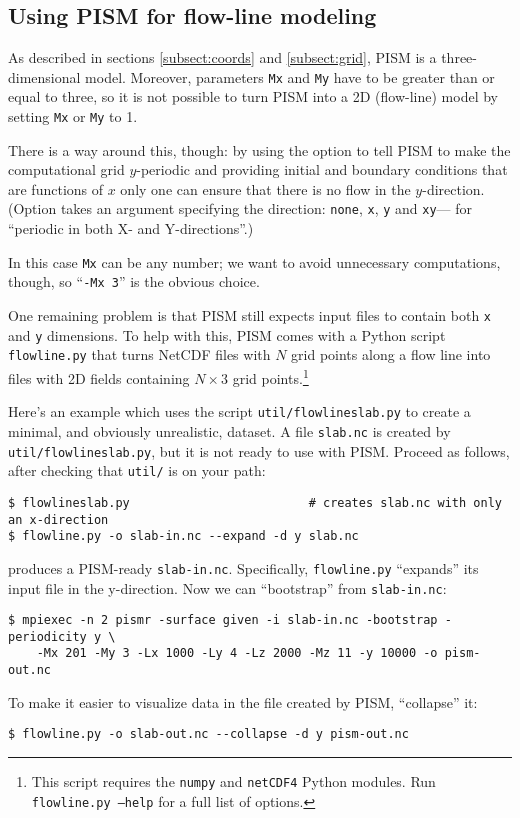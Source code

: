 \clearpage

\subsection{Using PISM for flow-line modeling}
\label{sec:flowline-modeling}

As described in sections \ref{subsect:coords} and \ref{subsect:grid}, PISM is a
three-dimensional model. Moreover, parameters
\texttt{Mx} and \texttt{My} have to be greater than or equal to three, so it is
not possible to turn PISM into a 2D (flow-line) model by setting \texttt{Mx} or
\texttt{My} to 1.

There is a way around this, though: by using the 
option to tell PISM to make the computational grid $y$-periodic and providing
initial and boundary conditions that are functions of $x$ only one can ensure
that there is no flow in the $y$-direction. (Option 
takes an argument specifying the direction: \texttt{none}, \texttt{x},
\texttt{y} and \texttt{xy}--- for ``periodic in both X- and Y-directions''.)

In this case \texttt{Mx} can be any number; we want to avoid unnecessary
computations, though, so ``\texttt{-Mx 3}'' is the obvious choice.

One remaining problem is that PISM still expects input files to contain both
\texttt{x} and \texttt{y} dimensions. To help with this, PISM comes with a
Python script \texttt{flowline.py} that turns NetCDF files with $N$ grid points
along a flow line into files with 2D fields containing $N\times3$ grid
points.\footnote{This script requires the \texttt{numpy} and
  \texttt{netCDF4} Python modules.  Run \texttt{flowline.py --help} for a
  full list of options.}

Here's an example which uses the script \texttt{util/flowlineslab.py} to create a minimal, and obviously unrealistic, dataset.  A file \texttt{slab.nc} is created by \texttt{util/flowlineslab.py}, but it is not ready to use with PISM.  Proceed as follows, after checking that \texttt{util/} is on your path:
\begin{verbatim}
$ flowlineslab.py                         # creates slab.nc with only an x-direction
$ flowline.py -o slab-in.nc --expand -d y slab.nc
\end{verbatim}
produces  a PISM-ready \texttt{slab-in.nc}.  Specifically, \texttt{flowline.py} ``expands'' its input file in the y-direction.  Now we can ``bootstrap'' from \texttt{slab-in.nc}:
\begin{verbatim}
$ mpiexec -n 2 pismr -surface given -i slab-in.nc -bootstrap -periodicity y \
    -Mx 201 -My 3 -Lx 1000 -Ly 4 -Lz 2000 -Mz 11 -y 10000 -o pism-out.nc
\end{verbatim}
To make it easier to visualize data in the file created by PISM, ``collapse'' it:
\begin{verbatim}
$ flowline.py -o slab-out.nc --collapse -d y pism-out.nc
\end{verbatim}

